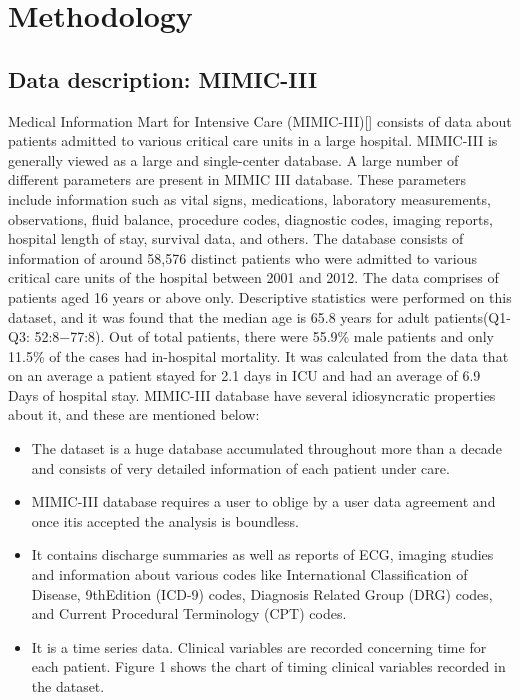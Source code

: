 \documentclass[12pt,a4paper]{article}
\begin{document}
\section{Methodology}
\subsection{Data description: MIMIC-III}
Medical Information Mart for Intensive Care (MIMIC-III)[] consists of data about patients
admitted to various critical care units in a large hospital. MIMIC-III is generally viewed as a
large and single-center database. A large number of different parameters are present in MIMIC III database. These parameters include information such as vital signs, medications, laboratory
measurements, observations, fluid balance, procedure codes, diagnostic codes, imaging reports,
hospital length of stay, survival data, and others.
The database consists of information of around 58,576 distinct patients who were admitted
to various critical care units of the hospital between 2001 and 2012. The data comprises of patients
aged 16 years or above only. Descriptive statistics were performed on this dataset, and it was found
that the median age is 65.8 years for adult patients(Q1-Q3: 52:8−77:8). Out of total patients, there
were 55.9\% male patients and only 11.5\% of the cases had in-hospital mortality. It was calculated
from the data that on an average a patient stayed for 2.1 days in ICU and had an average of 6.9
Days of hospital stay. MIMIC-III database have several idiosyncratic properties about it, and these
are mentioned below:
\begin{itemize}
    \item The dataset is a huge database accumulated throughout more than a decade and consists of very detailed information of each patient under care.
    \item MIMIC-III database requires a user to oblige by a user data agreement and once itis accepted the analysis is boundless.
    \item It contains discharge summaries as well as reports of ECG, imaging studies and information  about  various  codes  like  International  Classification  of  Disease,  9thEdition (ICD-9) codes, Diagnosis Related Group (DRG) codes, and Current Procedural Terminology (CPT) codes.
    \item It is a time series data.  Clinical variables are recorded concerning time for each patient.  Figure 1 shows the chart of timing clinical variables recorded in the dataset.
\end{itemize}
\end{document}

